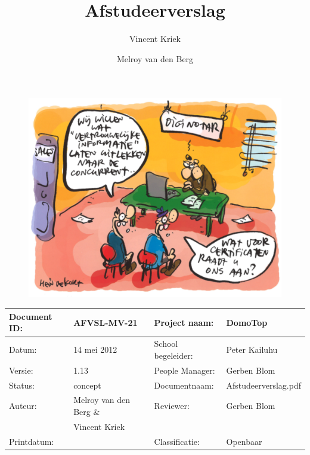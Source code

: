 \documentclass[]{article}
\makeatletter
\let\insertdate\@date
\newcommand{\version}{1.13}
\makeatother
\begin{document}
\thispagestyle{plain}

\title{Afstudeerverslag}
\author{Vincent Kriek \and Melroy van den Berg}

\maketitle

\begin{figure}[htpb]
   \begin{center}
     \includegraphics[width=\textwidth]{voorkant.pdf}
   \end{center}
\end{figure}

\vspace*{\fill}

\begin{tabular}{|| l | l || l | l ||}\hline
   Document ID: & AFVSL-MV-21          &Project naam:     &DomoTop             \\\hline
   Datum:       &14 mei 2012          &School begeleider:&Peter Kailuhu       \\\hline
   Versie:      &\version              &People Manager:   &Gerben Blom         \\\hline
   Status:      &concept               &Documentnaam:     &Afstudeerverslag.pdf\\\hline
   Auteur:      &Melroy van den Berg \&&Reviewer:         &Gerben Blom         \\
                &Vincent Kriek         &                  &                    \\\hline
   Printdatum:  &\insertdate           &Classificatie:    &Openbaar            \\\hline
\end{tabular}
\end{document}
